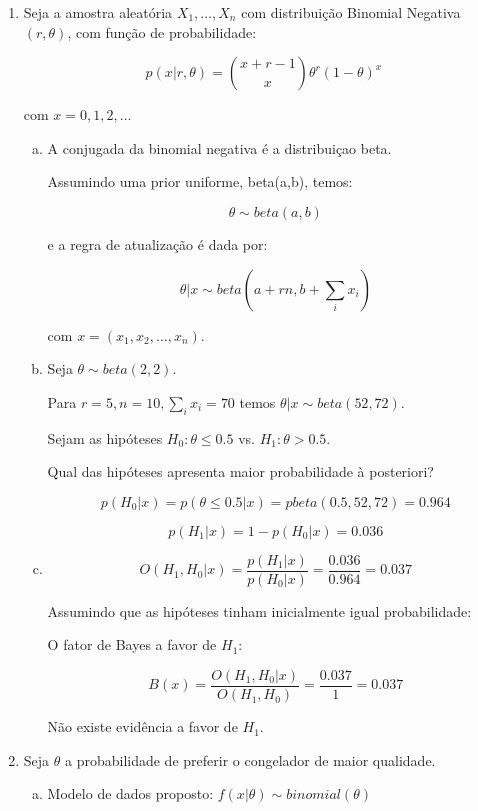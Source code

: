 \documentclass[10pt,brazil,addpoints]{exam}
\begin{document}
\begin{enumerate}[1.]

\item Seja a amostra aleatória $X_1, \ldots, X_n$ com distribuição Binomial Negativa$(r,\theta)$, com função de probabilidade:

$$p(x|r,\theta) = \binom {x+r-1} x \theta^r (1-\theta)^x$$

com $x = 0,1,2,\ldots$

\begin{enumerate}[a)]
\item A conjugada da binomial negativa é a distribuiçao beta.

Assumindo uma prior uniforme, beta(a,b), temos:

$$\theta \sim beta(a,b)$$

e a regra de atualização é dada por:

$$\theta | x \sim beta(a + rn, b + \sum_i x_i)$$

com $x = (x_1, x_2, \ldots, x_n)$.

\item Seja $\theta \sim beta(2,2)$.

Para $r=5, n=10, \sum_i x_i = 70$ temos $\theta|x \sim beta(52,72)$.

Sejam as hipóteses $H_0:\theta \leq 0.5$ vs. $H_1:\theta \gt 0.5$. 

Qual das hipóteses apresenta maior probabilidade à posteriori?

$$p(H_0|x) = p(\theta \leq 0.5|x) = pbeta(0.5,52,72) = 0.964$$

$$p(H_1|x) = 1 - p(H_0|x) = 0.036$$


\item $$O(H_1,H_0|x) = \frac{p(H_1|x)}{p(H_0|x)} = \frac{0.036}{0.964} = 0.037$$

Assumindo que as hipóteses tinham inicialmente igual probabilidade:

O fator de Bayes a favor de $H_1$:

$$B(x) = \frac{O(H_1,H_0|x)}{O(H_1,H_0)} = \frac{0.037}{1} = 0.037$$

Não existe evidência a favor de $H_1$.

\end{enumerate}

\item Seja $\theta$ a probabilidade de preferir o congelador de maior qualidade.

\begin{enumerate}[a)]
\item Modelo de dados proposto: $f(x|\theta) \sim binomial(\theta)$


\end{enumerate}
\end{enumerate}
\end{document}
